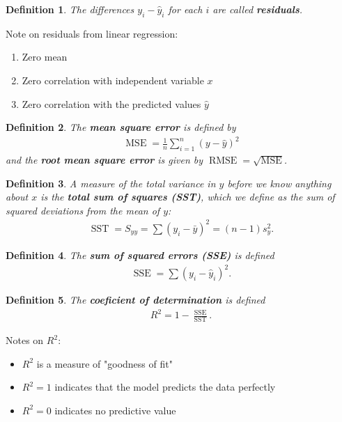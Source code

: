 \documentclass{article}
\theoremstyle{sltheorem}
\newtheorem{definition}{Definition}[section]
\DeclareMathOperator{\mse}{MSE}
\DeclareMathOperator{\rmse}{RMSE}
\DeclareMathOperator{\sst}{SST}
\DeclareMathOperator{\sse}{SSE}
\newcommand*\B[1]{\textbf{#1}}
\begin{document}
\begin{definition}
	The differences $y_i - \hat y_i$ for each $i$ are called \B{residuals}.
\end{definition}
Note on residuals from linear regression:
\begin{enumerate}
	\item Zero mean
	\item Zero correlation with independent variable $x$
	\item Zero correlation with the predicted values $\hat y$
\end{enumerate}
\begin{definition}
	The \B{mean square error} is defined by
	\begin{align*}
		\mse = \frac{1}{n}\sum_{i=1}^n (y-\hat y)^2
	\end{align*}
	and the \B{root mean square error} is given by $\rmse=\sqrt{\mse}$.
\end{definition}
\begin{definition}
	A measure of the total variance in $y$ before we know anything
	about $x$ is the \B{total sum of squares (SST)}, which we define
	as the sum of squared deviations from the mean of $y$:
	\begin{align*}
		\sst = S_{yy} = \sum (y_i - \bar y)^2 = (n-1)s^2_y.
	\end{align*}
\end{definition}
\begin{definition}
	The \B{sum of squared errors (SSE)} is defined
	\begin{align*}
		\sse = \sum (y_i -\hat y_i)^2.
	\end{align*}
\end{definition}
\begin{definition}
	The \B{coeficient of determination} is defined
	\begin{align*}
		R^2 = 1-\frac{\sse}{\sst}.
	\end{align*}
\end{definition}
Notes on $R^2$:
\begin{itemize}
	\item $R^2$ is a measure of "goodness of fit"
	\item $R^2=1$ indicates that the model predicts the data perfectly
	\item $R^2=0$ indicates no predictive value
\end{itemize}
\end{document}
